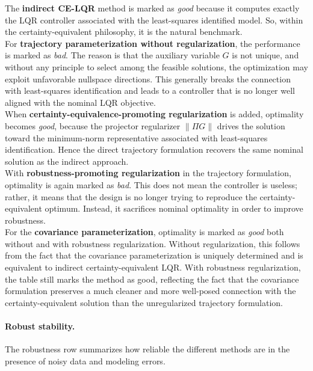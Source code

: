 The \textbf{indirect CE-LQR} method is marked as \emph{good} because it computes exactly the LQR
controller associated with the least-squares identified model. So, within the certainty-equivalent
philosophy, it is the natural benchmark.\\
For \textbf{trajectory parameterization without regularization}, the performance is marked as
\emph{bad}. The reason is that the auxiliary variable $G$ is not unique, and without any principle
to select among the feasible solutions, the optimization may exploit unfavorable nullspace
directions. This generally breaks the connection with least-squares identification and leads to a
controller that is no longer well aligned with the nominal LQR objective.\\
When \textbf{certainty-equivalence-promoting regularization} is added, optimality becomes
\emph{good}, because the projector regularizer $\|\Pi G\|$ drives the solution toward the
minimum-norm representative associated with least-squares identification. Hence the direct
trajectory formulation recovers the same nominal solution as the indirect approach.\\
With \textbf{robustness-promoting regularization} in the trajectory formulation, optimality is again
marked as \emph{bad}. This does not mean the controller is useless; rather, it means that the
design is no longer trying to reproduce the certainty-equivalent optimum. Instead, it sacrifices
nominal optimality in order to improve robustness.\\
For the \textbf{covariance parameterization}, optimality is marked as \emph{good} both without and
with robustness regularization. Without regularization, this follows from the fact that the
covariance parameterization is uniquely determined and is equivalent to indirect
certainty-equivalent LQR. With robustness regularization, the table still marks the method as
good, reflecting the fact that the covariance formulation preserves a much cleaner and more
well-posed connection with the certainty-equivalent solution than the unregularized trajectory
formulation.

\paragraph{Robust stability.}
The robustness row summarizes how reliable the different methods are in the presence of noisy
data and modeling errors.\\

